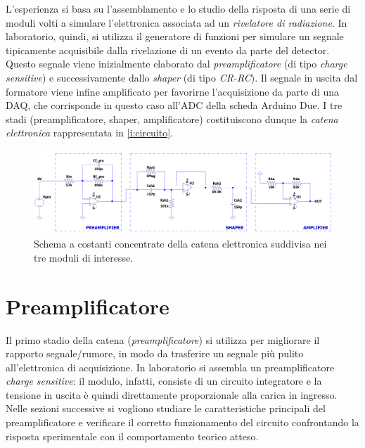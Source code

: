 \documentclass[a4paper,11pt]{article} %
\begin{document}
L'esperienza si basa su l'assemblamento e lo studio della risposta di una serie di moduli volti a simulare l'elettronica
associata ad un \textit{rivelatore di radiazione}. In laboratorio, quindi, si utilizza il generatore di funzioni per
simulare un segnale tipicamente acquisibile dalla rivelazione di un evento da parte del detector. Questo segnale viene
inizialmente elaborato dal \textit{preamplificatore} (di tipo \textit{charge sensitive}) e successivamente dallo
\textit{shaper} (di tipo \textit{CR-RC}). Il segnale in uscita dal formatore viene infine amplificato per favorirne
l'acquisizione da parte di una DAQ, che corrisponde in questo caso all'ADC della scheda Arduino Due. I tre stadi
(preamplificatore, shaper, amplificatore) costituiscono dunque la \textit{catena elettronica} rappresentata in
\autoref{i:circuito}.

\begin{figure}[H]
	\centering
	\includegraphics[width=0.9\linewidth]{../Simulations/catena_circuito.png}
	\caption{\small Schema a costanti concentrate della catena elettronica suddivisa nei tre moduli di interesse.}
	\label{i:circuito}
\end{figure}



\section{Preamplificatore}\label{s:preamp} 

Il primo stadio della catena (\textit{preamplificatore}) si utilizza per migliorare il rapporto segnale/rumore, in modo
da trasferire un segnale più pulito all'elettronica di acquisizione. In laboratorio si assembla un preamplificatore
\textit{charge sensitive}: il modulo, infatti, consiste di un circuito integratore e la tensione in uscita è quindi
direttamente proporzionale alla carica in ingresso. Nelle sezioni successive si vogliono studiare le caratteristiche
principali del preamplificatore e verificare il corretto funzionamento del circuito confrontando la risposta
sperimentale con il comportamento teorico atteso.
\end{document}
